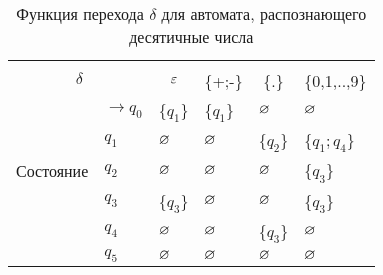 \begin{table}[H]
\centering
\begin{tabular}{llllll}
\toprule
%
\multicolumn{2}{c}{\multirow{2}{*}{\Large $\delta$}}
	& \multicolumn{4}{c}{\text{Вход}} \\
%
\cmidrule(rl){3-6}
%
\multicolumn{2}{c}{}
	& \multicolumn{1}{c}{$\varepsilon$}
    & \multicolumn{1}{c}{\{+;-\}}
    & \multicolumn{1}{c}{\{.\}}
    & \multicolumn{1}{c}{\{0,1,..,9\}} \\
%
\midrule
%
\multirow{5}{*}{Состояние}
    & $\to q_0$ & \{$q_1$\} 	& \{$q_1$\} 	& $\varnothing$ 		& $\varnothing$ \\
    & $q_1$ & $\varnothing$ 		& $\varnothing$ 		& \{$q_2$\}     & \{$q_1;q_4$\}     \\
    & $q_2$ & $\varnothing$ 		& $\varnothing$     	& $\varnothing$ 		& \{$q_3$\}     \\
    & $q_3$ & \{$q_3$\} 	& $\varnothing$     	& $\varnothing$     	& \{$q_3$\} \\
    & $q_4$ & $\varnothing$			& $\varnothing$         & \{$q_3$\}     & $\varnothing$         \\
    & $\boxed{q_5}$ & $\varnothing$ 		& $\varnothing$         & $\varnothing$         & $\varnothing$         \\
\bottomrule
\end{tabular}
\caption{Функция перехода $\delta$ для автомата, распознающего десятичные числа}
\label{tab4}
\end{table}
